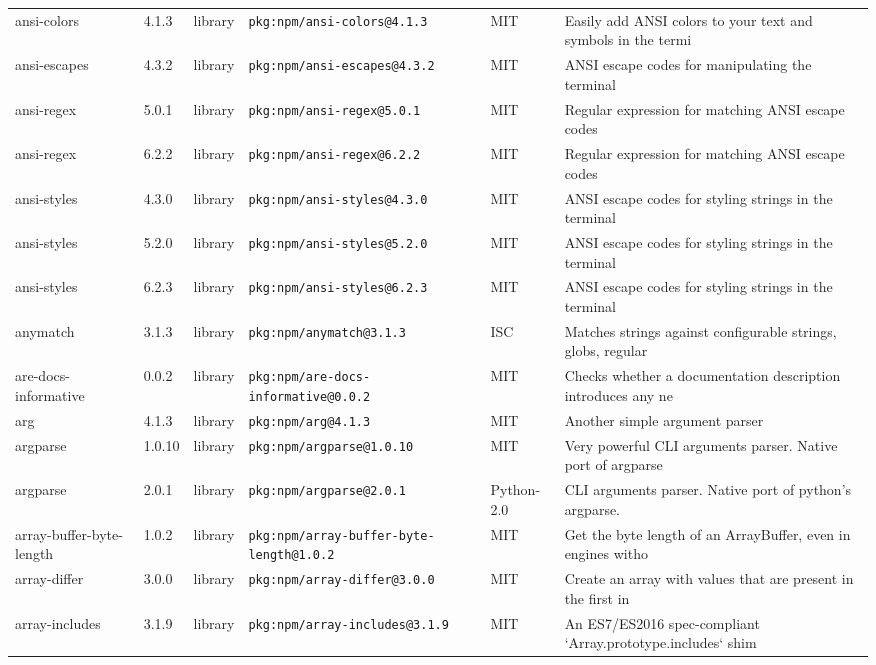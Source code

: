 \documentclass[11pt]{article}
\begin{document}
\begin{longtable}{|l|l|l|p{2.2cm}|l|p{4cm}|}
ansi-colors & 4.1.3 & library & \texttt{pkg:npm/ansi-colors@4.1.3} & MIT & Easily add ANSI colors to your text and symbols in the termi \\
ansi-escapes & 4.3.2 & library & \texttt{pkg:npm/ansi-escapes@4.3.2} & MIT & ANSI escape codes for manipulating the terminal \\
ansi-regex & 5.0.1 & library & \texttt{pkg:npm/ansi-regex@5.0.1} & MIT & Regular expression for matching ANSI escape codes \\
ansi-regex & 6.2.2 & library & \texttt{pkg:npm/ansi-regex@6.2.2} & MIT & Regular expression for matching ANSI escape codes \\
ansi-styles & 4.3.0 & library & \texttt{pkg:npm/ansi-styles@4.3.0} & MIT & ANSI escape codes for styling strings in the terminal \\
ansi-styles & 5.2.0 & library & \texttt{pkg:npm/ansi-styles@5.2.0} & MIT & ANSI escape codes for styling strings in the terminal \\
ansi-styles & 6.2.3 & library & \texttt{pkg:npm/ansi-styles@6.2.3} & MIT & ANSI escape codes for styling strings in the terminal \\
anymatch & 3.1.3 & library & \texttt{pkg:npm/anymatch@3.1.3} & ISC & Matches strings against configurable strings, globs, regular \\
are-docs-informative & 0.0.2 & library & \texttt{pkg:npm/are-docs-informative@0.0.2} & MIT & Checks whether a documentation description introduces any ne \\
arg & 4.1.3 & library & \texttt{pkg:npm/arg@4.1.3} & MIT & Another simple argument parser \\
argparse & 1.0.10 & library & \texttt{pkg:npm/argparse@1.0.10} & MIT & Very powerful CLI arguments parser. Native port of argparse  \\
argparse & 2.0.1 & library & \texttt{pkg:npm/argparse@2.0.1} & Python-2.0 & CLI arguments parser. Native port of python's argparse. \\
array-buffer-byte-length & 1.0.2 & library & \texttt{pkg:npm/array-buffer-byte-length@1.0.2} & MIT & Get the byte length of an ArrayBuffer, even in engines witho \\
array-differ & 3.0.0 & library & \texttt{pkg:npm/array-differ@3.0.0} & MIT & Create an array with values that are present in the first in \\
array-includes & 3.1.9 & library & \texttt{pkg:npm/array-includes@3.1.9} & MIT & An ES7/ES2016 spec-compliant `Array.prototype.includes` shim \\

\end{longtable}
\end{document}
